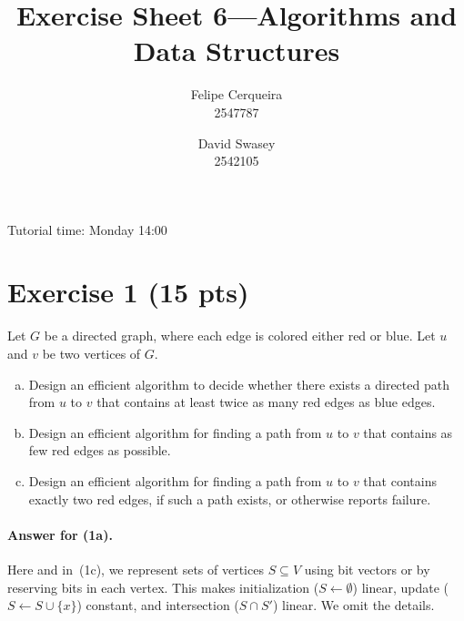 \documentclass[a4paper]{article}
\title{Exercise Sheet 6---Algorithms and Data Structures}
\author{Felipe Cerqueira \\ 2547787 \and David Swasey \\ 2542105}
\begin{document}
\maketitle

Tutorial time: Monday 14:00

\section*{Exercise 1 (15 pts)}

Let $G$ be a directed graph, where each edge is colored either red or blue.
Let $u$ and $v$ be two vertices of $G$.
\begin{enumerate}[a)]
	\item Design an efficient algorithm to decide whether there exists a directed path from $u$ to $v$ that contains at least twice as many red edges as blue edges.
	
	\item Design an efficient algorithm for finding a path from $u$ to $v$ that contains as few red edges as possible.
	
	\item Design an efficient algorithm for finding a path from $u$ to $v$ that contains exactly two red edges, if such a path exists, or otherwise reports failure.
\end{enumerate}

\paragraph{Answer for (1a).}
Here and in~(1c), we represent sets of vertices $S \subseteq V$ using bit vectors or by reserving bits in each vertex.
This makes initialization ($S \gets \emptyset$) linear, update ($S \gets S \cup \{ x \}$) constant, and intersection ($S \cap S'$) linear.
We omit the details.
\end{document}
